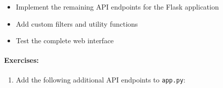 \documentclass[
  screen,review,acmlarge]{acmart}
\newcommand{\passthrough}[1]{#1}
\providecommand{\tightlist}{%
  \setlength{\itemsep}{0pt}\setlength{\parskip}{0pt}}
\begin{document}
\begin{itemize}
\tightlist
\item
  Implement the remaining API endpoints for the Flask application
\item
  Add custom filters and utility functions
\item
  Test the complete web interface
\end{itemize}

\paragraph{Exercises:}\label{exercises-6}

\begin{enumerate}
\def\labelenumi{\arabic{enumi}.}
\tightlist
\item
  Add the following additional API endpoints to \passthrough{\lstinline!app.py!}:
\end{enumerate}
\end{document}
